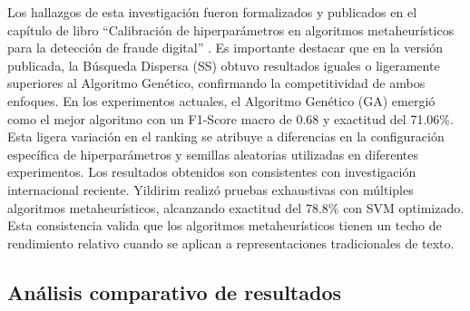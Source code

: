 Los hallazgos de esta investigación fueron formalizados y publicados en el capítulo de libro ``Calibración de hiperparámetros en algoritmos metaheurísticos para la detección de fraude digital'' \cite{hurtado2024calibracion}. Es importante destacar que en la versión publicada, la Búsqueda Dispersa (SS) obtuvo resultados iguales o ligeramente superiores al Algoritmo Genético, confirmando la competitividad de ambos enfoques. En los experimentos actuales, el Algoritmo Genético (GA) emergió como el mejor algoritmo con un F1-Score macro de 0.68 y exactitud del 71.06\%. Esta ligera variación en el ranking se atribuye a diferencias en la configuración específica de hiperparámetros y semillas aleatorias utilizadas en diferentes experimentos. Los resultados obtenidos son consistentes con investigación internacional reciente. Yildirim \cite{yildirim2023novel} realizó pruebas exhaustivas con múltiples algoritmos metaheurísticos, alcanzando exactitud del 78.8\% con SVM optimizado. Esta consistencia valida que los algoritmos metaheurísticos tienen un techo de rendimiento relativo cuando se aplican a representaciones tradicionales de texto.

\subsection{Análisis comparativo de resultados}
\label{subsec:analisis_comparativo}

\begin{table}[htbp]
\centering
{}
\caption{Resultados comparativos finales de los cinco algoritmos metaheurísticos implementados usando métricas macro promedio.}
\label{tab:resultados_comparativos_final}
\end{table}

